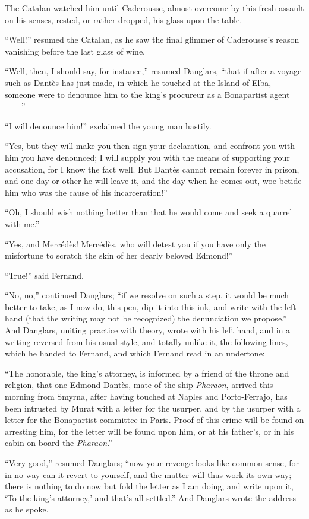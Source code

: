 The Catalan watched him until Caderousse, almost overcome by this fresh
assault on his senses, rested, or rather dropped, his glass upon the
table.

“Well!” resumed the Catalan, as he saw the final glimmer of
Caderousse’s reason vanishing before the last glass of wine.

“Well, then, I should say, for instance,” resumed Danglars, “that if
after a voyage such as Dantès has just made, in which he touched at the
Island of Elba, someone were to denounce him to the king’s procureur as
a Bonapartist agent——”

“I will denounce him!” exclaimed the young man hastily.

“Yes, but they will make you then sign your declaration, and confront
you with him you have denounced; I will supply you with the means of
supporting your accusation, for I know the fact well. But Dantès cannot
remain forever in prison, and one day or other he will leave it, and
the day when he comes out, woe betide him who was the cause of his
incarceration!”

“Oh, I should wish nothing better than that he would come and seek a
quarrel with me.”

“Yes, and Mercédès! Mercédès, who will detest you if you have only the
misfortune to scratch the skin of her dearly beloved Edmond!”

“True!” said Fernand.

“No, no,” continued Danglars; “if we resolve on such a step, it would
be much better to take, as I now do, this pen, dip it into this ink,
and write with the left hand (that the writing may not be recognized)
the denunciation we propose.” And Danglars, uniting practice with
theory, wrote with his left hand, and in a writing reversed from his
usual style, and totally unlike it, the following lines, which he
handed to Fernand, and which Fernand read in an undertone:

“The honorable, the king’s attorney, is informed by a friend of the
throne and religion, that one Edmond Dantès, mate of the ship
\textit{Pharaon}, arrived this morning from Smyrna, after having touched at
Naples and Porto-Ferrajo, has been intrusted by Murat with a letter for
the usurper, and by the usurper with a letter for the Bonapartist
committee in Paris. Proof of this crime will be found on arresting him,
for the letter will be found upon him, or at his father’s, or in his
cabin on board the \textit{Pharaon}.”

“Very good,” resumed Danglars; “now your revenge looks like common
sense, for in no way can it revert to yourself, and the matter will
thus work its own way; there is nothing to do now but fold the letter
as I am doing, and write upon it, ‘To the king’s attorney,’ and that’s
all settled.” And Danglars wrote the address as he spoke.


